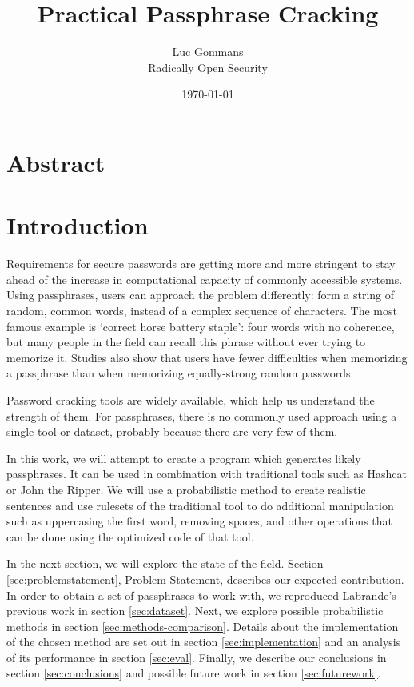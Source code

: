 \documentclass{article}
\begin{document}
\title{Practical Passphrase Cracking}
\date{\today{}}
\author{Luc Gommans \\
	Radically Open Security
}

\maketitle

\section*{Abstract}



\section{Introduction}


Requirements for secure passwords are getting more and more stringent to stay
ahead of the increase in computational capacity of commonly accessible systems.
Using passphrases, users can approach the problem differently: form a string of
random, common words, instead of a complex sequence of characters. The most
famous example is `correct horse battery staple': four words with no coherence,
but many people in the field can recall this phrase without ever trying to
memorize it\cite{own}. Studies also show that users have fewer difficulties
when memorizing a passphrase than when memorizing equally-strong random
passwords\cite{behavioral-analysis}\cite{pwd-memorability}.

Password cracking tools are widely available, which help us understand the
strength of them. For passphrases, there is no commonly used approach using a
single tool or dataset, probably because there are very few of them.

In this work, we will attempt to create a program which generates likely
passphrases. It can be used in combination with traditional tools such as
Hashcat or John the Ripper. We will use a probabilistic method to create
realistic sentences and use rulesets of the traditional tool to do additional
manipulation such as uppercasing the first word, removing spaces, and other
operations that can be done using the optimized code of that tool.

In the next section, we will explore the state of the field. Section
\ref{sec:problemstatement}, Problem Statement, describes our expected
contribution. In order to obtain a set of passphrases to work with, we
reproduced Labrande's previous work in section \ref{sec:dataset}. Next, we
explore possible probabilistic methods in section \ref{sec:methods-comparison}.
Details about the implementation of the chosen method are set out in section
\ref{sec:implementation} and an analysis of its performance in section
\ref{sec:eval}. Finally, we describe our conclusions in section
\ref{sec:conclusions} and possible future work in section \ref{sec:futurework}.
\end{document}
